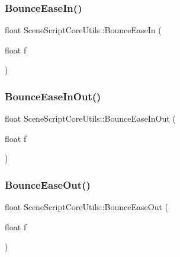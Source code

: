 \hypertarget{class_scene_script_core_utils_a1ba9e67039ca5ee1f17543767de32975}{}\label{class_scene_script_core_utils_a1ba9e67039ca5ee1f17543767de32975} 
\subsubsection{\texorpdfstring{Bounce\+Ease\+In()}{BounceEaseIn()}}
{\footnotesize\ttfamily float Scene\+Script\+Core\+Utils\+::\+Bounce\+Ease\+In (\begin{DoxyParamCaption}\item[{float}]{f }\end{DoxyParamCaption})}

\hypertarget{class_scene_script_core_utils_ace82c5375438a7f7d8eb0d3ea98633aa}{}\label{class_scene_script_core_utils_ace82c5375438a7f7d8eb0d3ea98633aa} 
\subsubsection{\texorpdfstring{Bounce\+Ease\+In\+Out()}{BounceEaseInOut()}}
{\footnotesize\ttfamily float Scene\+Script\+Core\+Utils\+::\+Bounce\+Ease\+In\+Out (\begin{DoxyParamCaption}\item[{float}]{f }\end{DoxyParamCaption})}

\hypertarget{class_scene_script_core_utils_ab8af5e249c0744049b040db7ac344de2}{}\label{class_scene_script_core_utils_ab8af5e249c0744049b040db7ac344de2} 
\subsubsection{\texorpdfstring{Bounce\+Ease\+Out()}{BounceEaseOut()}}
{\footnotesize\ttfamily float Scene\+Script\+Core\+Utils\+::\+Bounce\+Ease\+Out (\begin{DoxyParamCaption}\item[{float}]{f }\end{DoxyParamCaption})}

